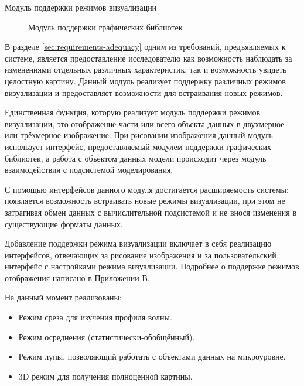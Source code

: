 \documentclass[a4paper,12pt]{extarticle}
\begin{document}
\begin{subsection}{Модуль поддержки режимов визуализации}
    \label{sec:architecture-render}
    \begin{figure}[h]
        \caption{Модуль поддержки графических библиотек}
        \label{ris:architecture-render}
    \end{figure}
    
    В разделе \ref{sec:requirements-adequacy} одним из требований, предъявляемых к системе, является предоставление исследователю как возможность наблюдать за изменениями отдельных различных характеристик, так и возможность увидеть целостную картину. Данный модуль реализует поддержку различных режимов визуализации и предоставляет возможности для встраивания новых режимов.

    Единственная функция, которую реализует модуль поддержки режимов визуализации, это отображение части или всего объекта данных в двухмерное или трёхмерное изображение. При рисовании изображения данный модуль использует интерфейс, предоставляемый модулем поддержки графических библиотек, а работа с объектом данных модели происходит через модуль взаимодействия с подсистемой моделирования. 

    С помощью интерфейсов данного модуля достигается расширяемость системы: появляется возможность встраивать новые режимы визуализации, при этом не затрагивая обмен данных с вычислительной подсистемой и не внося изменения в существующие форматы данных.

    Добавление поддержки режима визуализации включает в себя реализацию интерфейсов, отвечающих за рисование изображения и за пользовательский интерфейс с настройками режима визуализации. Подробнее о поддержке режимов отображения написано в Приложении В.
    
    На данный момент реализованы:
    \begin{itemize}
        \item Режим среза для изучения профиля волны.
        \item Режим осреднения (статистически-обобщённый).
        \item Режим лупы, позволяющий работать с объектами данных на микроуровне.
        \item 3D режим для получения полноценной картины.
    \end{itemize}
\end{subsection}
\end{document}
